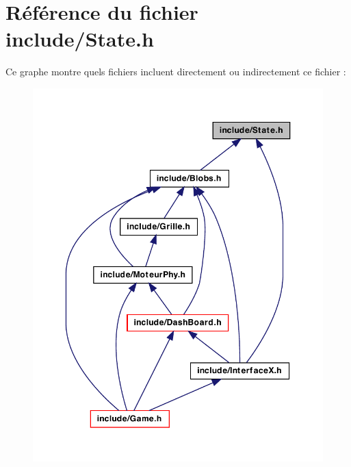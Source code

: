 \hypertarget{a00034}{
\section{Référence du fichier include/State.h}
\label{a00034}
}
Ce graphe montre quels fichiers incluent directement ou indirectement ce fichier :
\nopagebreak
\begin{figure}[H]
\begin{center}
\leavevmode
\includegraphics[width=350pt]{a00067}
\end{center}
\end{figure}
